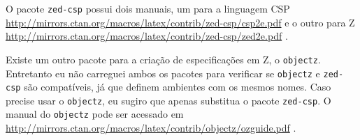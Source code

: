 O pacote \texttt{zed-csp} possui dois manuais, um para a linguagem CSP \url{http://mirrors.ctan.org/macros/latex/contrib/zed-csp/csp2e.pdf} \parencite{csp} e o outro para Z \url{http://mirrors.ctan.org/macros/latex/contrib/zed-csp/zed2e.pdf} \parencite{zed}. 

Existe um outro pacote para a criação de especificações em Z, o \texttt{objectz}. Entretanto eu não carreguei ambos os pacotes para verificar se \texttt{objectz} e \texttt{zed-csp} são compatíveis, já que definem ambientes com os mesmos nomes. Caso precise usar o \texttt{objectz}, eu sugiro que apenas substitua o pacote \texttt{zed-csp}. O manual do \texttt{objectz} pode ser acessado em \url{http://mirrors.ctan.org/macros/latex/contrib/objectz/ozguide.pdf} \parencite{objectz}.





